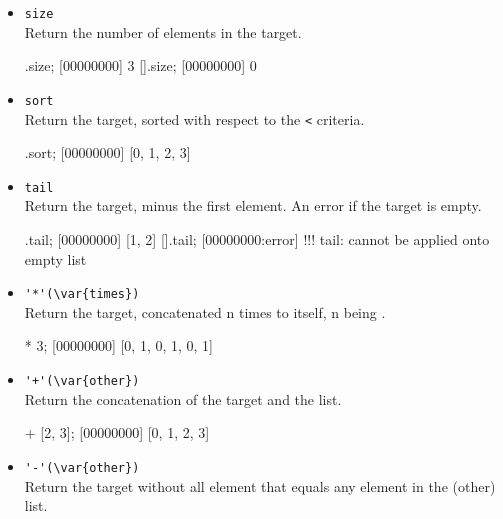 \begin{itemize}
\begin{urbiscript}[firstnumber=last]
var f = [0, 1, 2];
[00000000] [0, 1, 2]
f[1] = 42;
[00000000] 42
f;
[00000000] [0, 42, 2]
\end{urbiscript}

\item \lstinline|size|\\
Return the number of elements in the target.

\begin{urbiscript}[firstnumber=last]
[1, 2, 3].size;
[00000000] 3
[].size;
[00000000] 0
\end{urbiscript}

\item \lstinline|sort|\\
Return the target, sorted with respect to the \lstinline|<| criteria.

\begin{urbiscript}[firstnumber=last]
[1, 0, 3, 2].sort;
[00000000] [0, 1, 2, 3]
\end{urbiscript}

\item \lstinline|tail|\\
Return the target, minus the first element. An error if the target is
empty.

\begin{urbiscript}[firstnumber=last]
[0, 1, 2].tail;
[00000000] [1, 2]
[].tail;
[00000000:error] !!! tail: cannot be applied onto empty list
\end{urbiscript}

\item \lstinline|'*'(\var{times})|\\
Return the target, concatenated n times to itself, n being .

\begin{urbiscript}[firstnumber=last]
[0, 1] * 3;
[00000000] [0, 1, 0, 1, 0, 1]
\end{urbiscript}

\item \lstinline|'+'(\var{other})|\\
Return the concatenation of the target and the  list.

\begin{urbiscript}[firstnumber=last]
[0, 1] + [2, 3];
[00000000] [0, 1, 2, 3]
\end{urbiscript}

\item \lstinline|'-'(\var{other})|\\
Return the target without all element that equals any element in the
\var(other) list.


\end{itemize}
